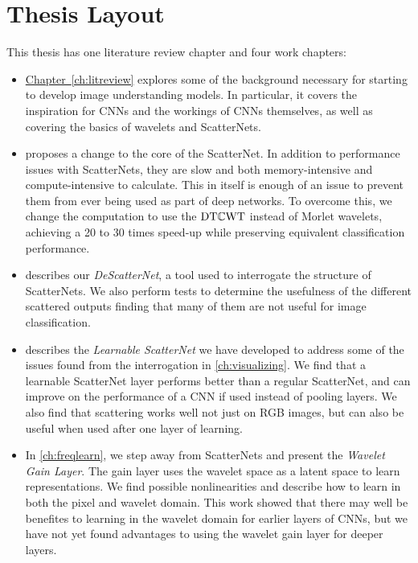 \section{Thesis Layout}
This thesis has one literature review chapter and four work chapters:
\begin{itemize}
\item
  \hyperref[ch:litreview]{Chapter~\ref*{ch:litreview}} 
  explores some of the background necessary for starting
  to develop image understanding models. In particular, it covers the
  inspiration for CNNs and the workings of CNNs themselves, as well as covering
  the basics of wavelets and ScatterNets.
\item 
   proposes a change to the core of the ScatterNet. In
  addition to performance issues with ScatterNets, they are slow and both
  memory-intensive and compute-intensive to calculate. This in itself is enough of an
  issue to prevent them from ever being used as part of deep networks. To
  overcome this, we change the computation to use the $\mathrm{DT}\mathbb{C}\mathrm{WT}$
  \cite{selesnick_dual-tree_2005} instead of Morlet wavelets, achieving a 20 to
  30 times speed-up while preserving equivalent classification performance.
\item 
   describes our \emph{DeScatterNet}, a tool used to
  interrogate the structure of ScatterNets. We also perform tests to determine
  the usefulness of the different scattered outputs finding that many of them
  are not useful for image classification.
\item 
   describes the \emph{Learnable ScatterNet} we have developed to 
  address some of the issues found from the interrogation in
  \autoref{ch:visualizing}. We find that a learnable ScatterNet layer performs
  better than a regular ScatterNet, and can improve on the performance of a CNN 
  if used instead of pooling layers. We also find that scattering works well not
  just on RGB images, but can also be useful when used after one layer of
  learning.
\item
  In \autoref{ch:freqlearn}, we step away from ScatterNets and present the
  \emph{Wavelet Gain Layer}. The gain layer uses 
  the wavelet space as a latent space to learn representations. We find possible
  nonlinearities and describe how to learn in both the pixel and wavelet domain.
  This work showed that there may well be benefites to learning in the wavelet
  domain for earlier layers of CNNs, but we have not yet found advantages to
  using the wavelet gain layer for deeper layers.
\end{itemize}

